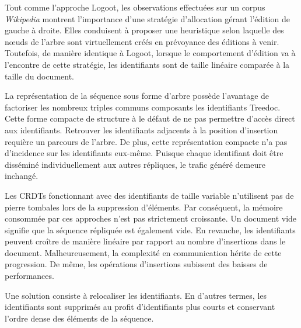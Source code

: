 
\noindent Tout comme l'approche Logoot, les observations effectuées sur un
corpus \emph{Wikipedia} montrent l'importance d'une stratégie d'allocation
gérant l'édition de gauche à droite. Elles conduisent à proposer une heuristique
selon laquelle des nœuds de l'arbre sont virtuellement créés en prévoyance des
éditions à venir. Toutefois, de manière identique à Logoot, lorsque le
comportement d'édition va à l'encontre de cette stratégie, les identifiants sont
de taille linéaire comparée à la taille du document.

\noindent La représentation de la séquence sous forme d'arbre possède l'avantage
de factoriser les nombreux triples communs composants les identifiants
Treedoc. Cette forme compacte de structure à le défaut de ne pas permettre
d'accès direct aux identifiants. Retrouver les identifiants adjacents à la
position d'insertion requière un parcours de l'arbre. De plus, cette
représentation compacte n'a pas d'incidence sur les identifiants
eux-même. Puisque chaque identifiant doit être disséminé individuellement aux
autres répliques, le trafic généré demeure inchangé.


Les CRDTs fonctionnant avec des identifiants de taille variable n'utilisent pas
de pierre tombales lors de la suppression d'éléments. Par conséquent, la mémoire
consommée par ces approches n'est pas strictement croissante. Un document vide
signifie que la séquence répliquée est également vide. En revanche, les
identifiants peuvent croître de manière linéaire par rapport au nombre
d'insertions dans le document. Malheureusement, la complexité en communication
hérite de cette progression. De même, les opérations d'insertions subissent des
baisses de performances. 

Une solution consiste à relocaliser les identifiants. En d'autres termes, les
identifiants sont supprimés au profit d'identifiants plus courts et conservant
l'ordre dense des éléments de la séquence.



